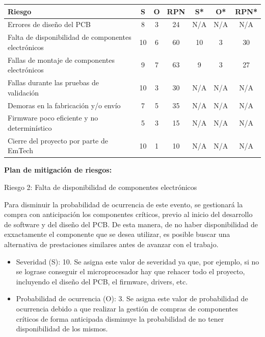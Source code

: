 \documentclass[
11pt, %
]{charter}
\begin{document}
\begin{table}[htpb]
\centering
\begin{tabularx}{\linewidth}{@{}|X|c|c|c|c|c|c|@{}}
\hline
\rowcolor[HTML]{C0C0C0} 
Riesgo                                                & S & O & RPN & S* & O* & RPN* \\ \hline
Errores de diseño del PCB                             &8  &3  &24   &N/A  &N/A &N/A      \\ \hline
Falta de disponibilidad de componentes electrónicos   &10 &6  &60   &10  &3  &30      \\ \hline
Fallas de montaje de componentes electrónicos &9  &7  &63    &9  &3  &27      \\ \hline
Fallas durante las pruebas de validación              &10 &3  &30   &N/A  &N/A &N/A      \\ \hline
Demoras en la fabricación y/o envío                   &7   &5   &35 &N/A  &N/A  &N/A      \\ \hline
Firmware poco eficiente y no determinístico           &5 &3   &15  &N/A &N/A &N/A      \\ \hline
Cierre del proyecto por parte de EmTech               &10 &1  &10  &N/A  &N/A  &N/A      \\ \hline
\end{tabularx}%
\end{table}

\textbf{Plan de mitigación de riesgos:}

 
Riesgo 2: Falta de disponibilidad de componentes electrónicos

Para disminuir la probabilidad de ocurrencia de este evento, se gestionará la compra con anticipación los componentes críticos, previo al inicio del desarrollo de software y del diseño del PCB. De esta manera, de no haber disponibilidad de exxactamente el componente que se desea utilizar, es posible buscar una alternativa de prestaciones similares antes de avanzar con el trabajo. 
\begin{itemize}	
	\item Severidad (S): 10. Se asigna este valor de severidad ya que, por ejemplo, si no se lograse conseguir el microprocesador hay que rehacer todo el proyecto, incluyendo el diseño del PCB, el firmware, drivers, etc.\\
	\item Probabilidad de ocurrencia (O): 3. Se asigna este valor de probabilidad de ocurrencia debido a que realizar la gestión de compras de componentes críticos de forma anticipada disminuye la probabilidad de no tener disponibilidad de los mismos.\\
	
\end{itemize}   
\end{document}
